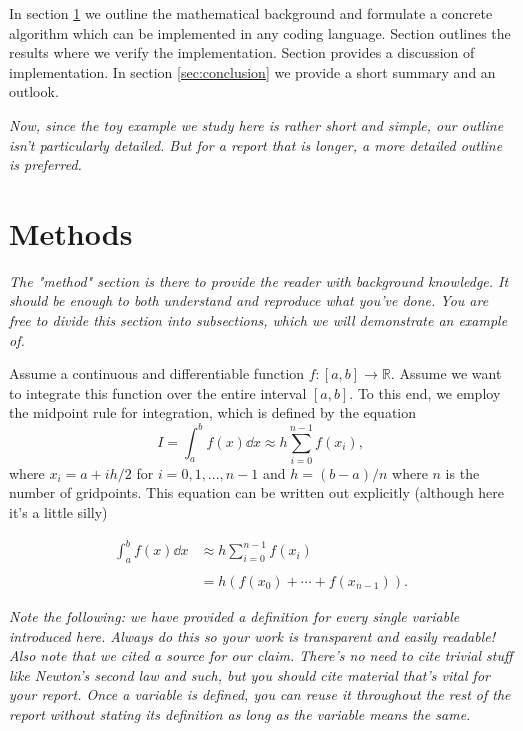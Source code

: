 \documentclass[english,notitlepage, reprint]{revtex4-1}  %
\begin{document}
In section \ref{sec:methods} we outline the mathematical background and formulate a concrete algorithm which can be implemented in any coding language. Section \label{sec:results} outlines the results where we verify the implementation. Section \label{sec:discussion} provides a discussion of implementation. In section \ref{sec:conclusion} we provide a short summary and an outlook.

\textit{Now, since the toy example we study here is rather short and simple, our outline isn't particularly detailed. But for a report that is longer, a more detailed outline is preferred.}

\section{Methods}\label{sec:methods}
\textit{The "method" section is there to provide the reader with background knowledge. It should be enough to both understand and reproduce what you've done. You are free to divide this section into subsections, which we will demonstrate an example of.}

Assume a continuous and differentiable function $f : [a,b] \to \mathbb{R}$. Assume we want to integrate this function over the entire interval $[a,b]$. To this end, we employ the midpoint rule for integration, which is defined by the equation \cite{midpoint_rule}
\begin{equation}
	I = \int_a^b f(x)\dd x \approx h\sum_{i=0}^{n-1} f(x_i), 
\end{equation}
where $x_i = a + ih/2$ for $i = 0, 1, ..., n-1$ and $h = (b-a)/n$ where $n$ is the number of gridpoints. This equation can be written out explicitly (although here it's a little silly)

\begin{equation}
	\begin{split}
		\int_a^b f(x)\dd x & \approx h \sum_{i=0}^{n-1} f(x_i) \\
									\\
									& = h\left(f(x_0) + \cdots + f(x_{n-1})\right).
	\end{split}
\end{equation}

\textit{Note the following: we have provided a definition for every single variable introduced here. Always do this so your work is transparent and easily readable! Also note that we cited a source for our claim. There's no need to cite trivial stuff like Newton's second law and such, but you should cite material that's vital for your report. Once a variable is defined, you can reuse it throughout the rest of the report without stating its definition as long as the variable means the same.}
\end{document}
